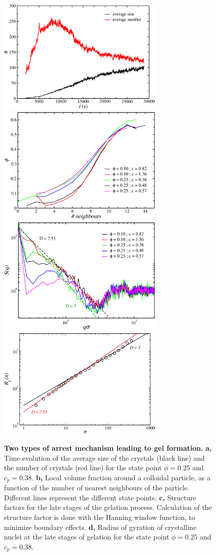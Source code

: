 \documentclass[a4paper,preprint,superscriptaddress]{revtex4}
\begin{document}
\clearpage 

\begin{figure}[!t]
 \centering
 \includegraphics[width=8cm]{fig3a}
 \includegraphics[width=8cm]{fig3b}
 \includegraphics[width=8cm]{fig3c}
 \includegraphics[width=8cm]{fig3d}
 \caption{{\bf Two types of arrest mechanism leading to gel formation.} {\bf a,} Time evolution of the average size of the crystals (black line) and the number of crystals (red line) for the state point $\phi=0.25$ and $c_p=0.38$. {\bf b,} Local volume fraction around a colloidal particle, as a function of the number of nearest neighbours of the particle.
 Different lines represent the different state points. {\bf c,} Structure factors for the late stages of the gelation process. Calculation of the structure factor is done with the Hanning window function,  to minimize boundary effects. {\bf d,} Radius of gyration of crystalline nuclei at the late stages of gelation for the state point $\phi=0.25$ and $c_p=0.38$.} 
 \label{fig:crystals}
\end{figure}
\end{document}
